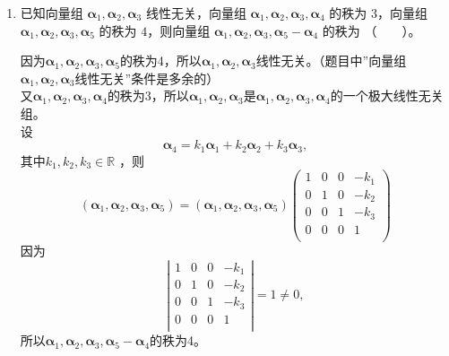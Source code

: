 \begin{enumerate}[1~]
\begin{enumerate}[1.~]
\item
已知向量组 $\boldsymbol{\alpha}_1, \boldsymbol{\alpha}_2, \boldsymbol{\alpha}_3$ 线性无关，向量组 $\boldsymbol{\alpha}_1, \boldsymbol{\alpha}_2, \boldsymbol{\alpha}_3, \boldsymbol{\alpha}_4$ 的秩为 $3$，向量组 $\boldsymbol{\alpha}_1, \boldsymbol{\alpha}_2, \boldsymbol{\alpha}_3, \boldsymbol{\alpha}_5$ 的秩为 $4$，则向量组 $\boldsymbol{\alpha}_1, \boldsymbol{\alpha}_2, \boldsymbol{\alpha}_3, \boldsymbol{\alpha}_5 - \boldsymbol{\alpha}_4$ 的秩为 （\ \ \ \ ）。
\begin{solution}
因为$\boldsymbol{\alpha}_1,\boldsymbol{\alpha}_2,\boldsymbol{\alpha}_3,\boldsymbol{\alpha}_5$的秩为4，所以$\boldsymbol{\alpha}_1,\boldsymbol{\alpha}_2,\boldsymbol{\alpha}_3$线性无关。（题目中''向量组$\boldsymbol{\alpha}_1,\boldsymbol{\alpha}_2,\boldsymbol{\alpha}_3$线性无关''条件是多余的）\\
又$\boldsymbol{\alpha}_1,\boldsymbol{\alpha}_2,\boldsymbol{\alpha}_3,\boldsymbol{\alpha}_4$的秩为3，所以$\boldsymbol{\alpha}_1,\boldsymbol{\alpha}_2,\boldsymbol{\alpha}_3$是$\boldsymbol{\alpha}_1,\boldsymbol{\alpha}_2,\boldsymbol{\alpha}_3,\boldsymbol{\alpha}_4$的一个极大线性无关组。\\
设\[
\boldsymbol{\alpha}_4 = k_1 \boldsymbol{\alpha}_1 + k_2 \boldsymbol{\alpha}_2 + k_3 \boldsymbol{\alpha}_3,
\]
其中$k_1, k_2, k_3 \in \mathbb{R}$ ，则\[
(\boldsymbol{\alpha}_1, \boldsymbol{\alpha}_2, \boldsymbol{\alpha}_3, \boldsymbol{\alpha}_5) = (\boldsymbol{\alpha}_1, \boldsymbol{\alpha}_2, \boldsymbol{\alpha}_3, \boldsymbol{\alpha}_5) \left( \begin{matrix}
	1&		0&		0&		-k_1\\
	0&		1&		0&		-k_2\\
	0&		0&		1&		-k_3\\
	0&		0&		0&		1\\
\end{matrix} \right)  
\]
因为\[
\left| \begin{matrix}
	1&		0&		0&		-k_1\\
	0&		1&		0&		-k_2\\
	0&		0&		1&		-k_3\\
	0&		0&		0&		1\\
\end{matrix} \right| = 1\ne 0,
\]
所以$\boldsymbol{\alpha}_1, \boldsymbol{\alpha}_2, \boldsymbol{\alpha}_3, \boldsymbol{\alpha}_5-\boldsymbol{\alpha}_4$的秩为4。
\end{solution}


\end{enumerate}
\end{enumerate}
